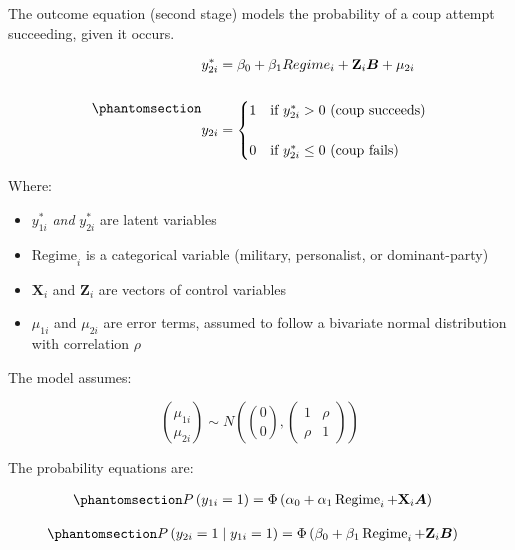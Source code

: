 \documentclass[
  12pt,
]{report}
\begin{document}
The outcome equation (second stage) models the probability of a coup
attempt succeeding, given it occurs.

\begin{equation}\phantomsection\label{eq-eq5}{
\begin{aligned}
y_{2i}^*&=\beta_0 + \beta_1 Regime_i + \mathbf{Z}_i \boldsymbol{B} + \mu_{2i}
\\
\\
y_{2i} &= 
\begin{cases} 
1 &\text{if $y_{2i}^*>0$ (coup succeeds)} \\
\\
0 &\text{if $y_{2i}^*\le0$ (coup fails)}
\end{cases}
\end{aligned}
}\end{equation}

Where:

\begin{itemize}
\item
  \(y_{1i}^*\) \emph{and} \(y_{2i}^*\) are latent variables
\item
  \(\text{Regime}_i\) is a categorical variable (military, personalist,
  or dominant-party)
\item
  \(\mathbf{X}_i\) and \(\mathbf{Z}_i\) are vectors of control variables
\item
  \(\mu_{1i}\) and \(\mu_{2i}\) are error terms, assumed to follow a
  bivariate normal distribution with correlation \(\rho\)
\end{itemize}

The model assumes:

\[
\binom{\mu_{1 i}}{\mu_{2 i}} \sim N\left(\binom{0}{0},\left(\begin{array}{ll}
1 & \rho \\
\rho & 1
\end{array}\right)\right)
\]

The probability equations are:

\begin{equation}\phantomsection\label{eq-eq7}{
\begin{aligned}
P\left(y_{1 i}=1\right) & =\Phi\left(\alpha_0+\alpha_1 \operatorname{Regime}_i+\mathbf{X}_i \boldsymbol{A}\right)
\end{aligned}
}\end{equation}

\begin{equation}\phantomsection\label{eq-eq8}{
\begin{aligned}
P\left(y_{2 i}=1 \mid y_{1 i}=1\right) & =\Phi\left(\beta_0+\beta_1 \operatorname{Regime}_i+\mathbf{Z}_i \boldsymbol{B}\right)
\end{aligned}
}\end{equation}
\end{document}

